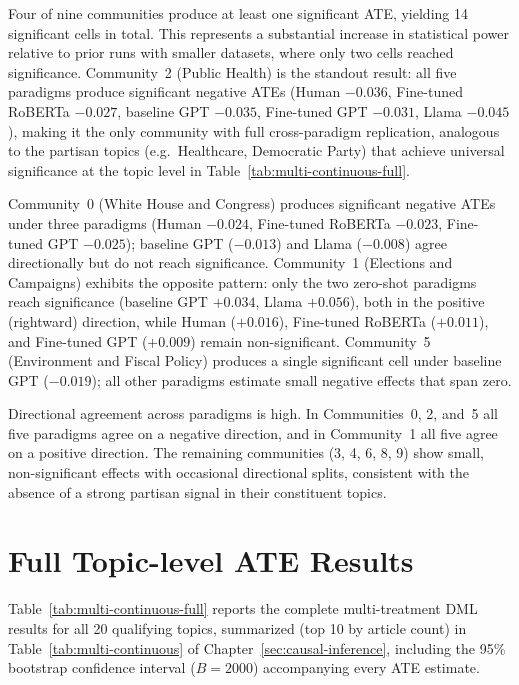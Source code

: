 Four of nine communities produce at least one significant ATE, yielding 14 significant cells in total. This represents a substantial increase in statistical power relative to prior runs with smaller datasets, where only two cells reached significance. Community~2 (Public Health) is the standout result: all five paradigms produce significant negative ATEs (Human $-0.036$, Fine-tuned RoBERTa $-0.027$, baseline GPT $-0.035$, Fine-tuned GPT $-0.031$, Llama $-0.045$), making it the only community with full cross-paradigm replication, analogous to the partisan topics (e.g.\ Healthcare, Democratic Party) that achieve universal significance at the topic level in Table~\ref{tab:multi-continuous-full}.

Community~0 (White House and Congress) produces significant negative ATEs under three paradigms (Human $-0.024$, Fine-tuned RoBERTa $-0.023$, Fine-tuned GPT $-0.025$); baseline GPT ($-0.013$) and Llama ($-0.008$) agree directionally but do not reach significance. Community~1 (Elections and Campaigns) exhibits the opposite pattern: only the two zero-shot paradigms reach significance (baseline GPT $+0.034$, Llama $+0.056$), both in the positive (rightward) direction, while Human ($+0.016$), Fine-tuned RoBERTa ($+0.011$), and Fine-tuned GPT ($+0.009$) remain non-significant. Community~5 (Environment and Fiscal Policy) produces a single significant cell under baseline GPT ($-0.019$); all other paradigms estimate small negative effects that span zero.

Directional agreement across paradigms is high. In Communities~0, 2, and~5 all five paradigms agree on a negative direction, and in Community~1 all five agree on a positive direction. The remaining communities (3, 4, 6, 8, 9) show small, non-significant effects with occasional directional splits, consistent with the absence of a strong partisan signal in their constituent topics.



\section{Full Topic-level ATE Results}

Table~\ref{tab:multi-continuous-full} reports the complete multi-treatment DML results for all 20 qualifying topics, summarized (top 10 by article count) in Table~\ref{tab:multi-continuous} of Chapter~\ref{sec:causal-inference}, including the 95\% bootstrap confidence interval ($B = \num{2000}$) accompanying every ATE estimate.

